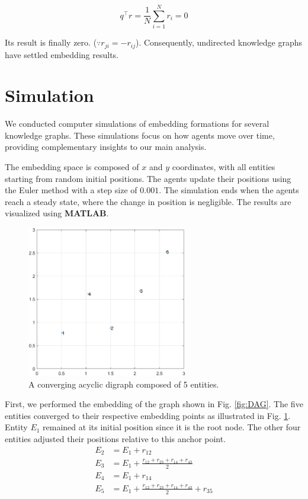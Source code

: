 \documentclass[letterpaper, 10 pt, conference]{ieeeconf}  %
\begin{document}
\[
q^\top r = \frac{1}{N} \sum_{i = 1}^N r_i = 0
\]

\noindent Its result is finally zero. (\(\because r_{ji} = -r_{ij}\)). Consequently, undirected knowledge graphs have settled embedding results. 

\section{Simulation}
We conducted computer simulations of embedding formations for several knowledge graphs. These simulations focus on how agents move over time, providing complementary insights to our main analysis.

The embedding space is composed of \(x\) and \(y\) coordinates, with all entities starting from random initial positions. The agents update their positions using the Euler method with a step size of \(0.001\). The simulation ends when the agents reach a steady state, where the change in position is negligible. The results are visualized using \textbf{MATLAB}.

\begin{figure}[thb]
    \begin{center}
    \includegraphics[width=7cm]{IMG/AG_simul3.png}
    \caption{A converging acyclic digraph composed of 5 entities.}
    \label{fig:DAGstate}
    \end{center}
    \vspace{-0mm}
\end{figure}




First, we performed the embedding of the graph shown in Fig. \ref{fig:DAG}. The five entities converged to their respective embedding points as illustrated in Fig. \ref{fig:DAGstate}. Entity \(E_1\) remained at its initial position since it is the root node. The other four entities adjusted their positions relative to this anchor point.
\begin{equation}\label{eq:result1}
\begin{split}
    E_2 &= E_1 + r_{12}\\
    E_3 &= E_1 + \frac{r_{12}+r_{23}+r_{14}+r_{43}}{2}\\
    E_4 &= E_1 + r_{14}\\
    E_5 &= E_1 + \frac{r_{12}+r_{23}+r_{14}+r_{43}}{2} + r_{35}
\end{split}
\end{equation}
\end{document}
